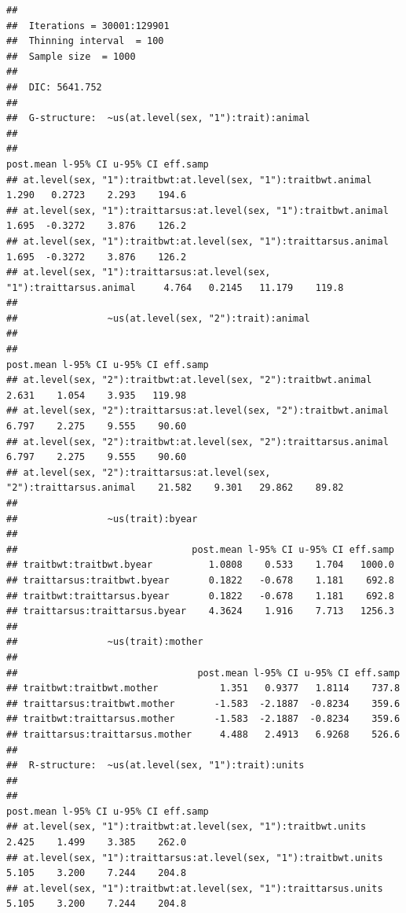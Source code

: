 \documentclass[
  12pt,
]{book}
\begin{document}
\begin{verbatim}
## 
##  Iterations = 30001:129901
##  Thinning interval  = 100
##  Sample size  = 1000 
## 
##  DIC: 5641.752 
## 
##  G-structure:  ~us(at.level(sex, "1"):trait):animal
## 
##                                                                      post.mean l-95% CI u-95% CI eff.samp
## at.level(sex, "1"):traitbwt:at.level(sex, "1"):traitbwt.animal           1.290   0.2723    2.293    194.6
## at.level(sex, "1"):traittarsus:at.level(sex, "1"):traitbwt.animal        1.695  -0.3272    3.876    126.2
## at.level(sex, "1"):traitbwt:at.level(sex, "1"):traittarsus.animal        1.695  -0.3272    3.876    126.2
## at.level(sex, "1"):traittarsus:at.level(sex, "1"):traittarsus.animal     4.764   0.2145   11.179    119.8
## 
##                ~us(at.level(sex, "2"):trait):animal
## 
##                                                                      post.mean l-95% CI u-95% CI eff.samp
## at.level(sex, "2"):traitbwt:at.level(sex, "2"):traitbwt.animal           2.631    1.054    3.935   119.98
## at.level(sex, "2"):traittarsus:at.level(sex, "2"):traitbwt.animal        6.797    2.275    9.555    90.60
## at.level(sex, "2"):traitbwt:at.level(sex, "2"):traittarsus.animal        6.797    2.275    9.555    90.60
## at.level(sex, "2"):traittarsus:at.level(sex, "2"):traittarsus.animal    21.582    9.301   29.862    89.82
## 
##                ~us(trait):byear
## 
##                               post.mean l-95% CI u-95% CI eff.samp
## traitbwt:traitbwt.byear          1.0808    0.533    1.704   1000.0
## traittarsus:traitbwt.byear       0.1822   -0.678    1.181    692.8
## traitbwt:traittarsus.byear       0.1822   -0.678    1.181    692.8
## traittarsus:traittarsus.byear    4.3624    1.916    7.713   1256.3
## 
##                ~us(trait):mother
## 
##                                post.mean l-95% CI u-95% CI eff.samp
## traitbwt:traitbwt.mother           1.351   0.9377   1.8114    737.8
## traittarsus:traitbwt.mother       -1.583  -2.1887  -0.8234    359.6
## traitbwt:traittarsus.mother       -1.583  -2.1887  -0.8234    359.6
## traittarsus:traittarsus.mother     4.488   2.4913   6.9268    526.6
## 
##  R-structure:  ~us(at.level(sex, "1"):trait):units
## 
##                                                                     post.mean l-95% CI u-95% CI eff.samp
## at.level(sex, "1"):traitbwt:at.level(sex, "1"):traitbwt.units           2.425    1.499    3.385    262.0
## at.level(sex, "1"):traittarsus:at.level(sex, "1"):traitbwt.units        5.105    3.200    7.244    204.8
## at.level(sex, "1"):traitbwt:at.level(sex, "1"):traittarsus.units        5.105    3.200    7.244    204.8

\end{verbatim}
\end{document}
